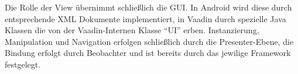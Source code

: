 Die Rolle der View übernimmt schließlich die GUI. In Android wird diese durch entsprechende XML Dokumente implementiert, in Vaadin durch spezielle Java Klassen die von der Vaadin-Internen Klasse ``UI'' erben. Instanzierung, Manipulation und Navigation erfolgen schließlich durch die Presenter-Ebene, die Bindung erfolgt durch Beobachter und ist bereits durch das jewilige Framework festgelegt.


